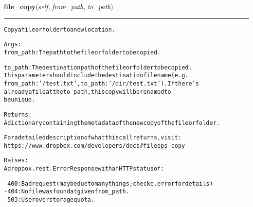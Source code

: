 \hspace{.8\funcindent}\begin{boxedminipage}{\funcwidth}

    \raggedright \textbf{file\_copy}(\textit{self}, \textit{from\_path}, \textit{to\_path})

    \vspace{-1.5ex}

    \rule{\textwidth}{0.5\fboxrule}
\setlength{\parskip}{2ex}
\begin{alltt}
Copy a file or folder to a new location.

Args:
    from\_path: The path to the file or folder to be copied.

    to\_path: The destination path of the file or folder to be copied.
        This parameter should include the destination filename (e.g.
        from\_path: '/test.txt', to\_path: '/dir/test.txt'). If there's
        already a file at the to\_path, this copy will be renamed to
        be unique.

Returns:
    A dictionary containing the metadata of the new copy of the file or folder.

    For a detailed description of what this call returns, visit:
    https://www.dropbox.com/developers/docs\#fileops-copy

Raises:
    A dropbox.rest.ErrorResponse with an HTTP status of:

    - 400: Bad request (may be due to many things; check e.error for details)
    - 404: No file was found at given from\_path.
    - 503: User over storage quota.
\end{alltt}

\setlength{\parskip}{1ex}
    \end{boxedminipage}

    \label{lib:dropbox:DropboxClient:file_create_folder}

    \vspace{0.5ex}

